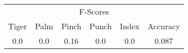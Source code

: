 \documentclass{standalone}
\begin{document}
 
 \begin{tabular}{|c|c|c|c|c ||c|}
\cline{1-6}\multicolumn{6}{|c|}{F-Scores} \\ 
\cline{1-6}Tiger & Palm & Pinch & Punch & Index & Accuracy\\ 
\cline{1-6}0.0 & 0.0 & 0.16 & 0.0 & 0.0 & 0.087\\ 
 \cline{1-6}\hline \end{tabular}
 
\end{document}
